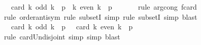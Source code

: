 \begin{isabellebody}
\ {\isachardoublequoteopen}{\isachardot}{\kern0pt}{\isachardot}{\kern0pt}{\isachardot}{\kern0pt}\ {\isacharequal}{\kern0pt}\ card\ {\isacharparenleft}{\kern0pt}{\isacharparenleft}{\kern0pt}{\isacharbraceleft}{\kern0pt}k{\isachardot}{\kern0pt}\ odd\ k{\isacharbraceright}{\kern0pt}\ {\isasyminter}\ {\isacharbraceleft}{\kern0pt}{}{\isachardot}{\kern0pt}{\isachardot}{\kern0pt}{\isacharless}{\kern0pt}p{\isacharbraceright}{\kern0pt}{\isacharparenright}{\kern0pt}\ {\isasymunion}\ {\isacharparenleft}{\kern0pt}{\isacharbraceleft}{\kern0pt}k{\isachardot}{\kern0pt}\ even\ k{\isacharbraceright}{\kern0pt}\ {\isasyminter}\ {\isacharbraceleft}{\kern0pt}{}{\isachardot}{\kern0pt}{\isachardot}{\kern0pt}{\isacharless}{\kern0pt}p{\isacharbraceright}{\kern0pt}{\isacharparenright}{\kern0pt}{\isacharparenright}{\kern0pt}{\isachardoublequoteclose}\ \isanewline
\ \ \ \ \isamarkupfalse%
\ {\isacharparenleft}{\kern0pt}rule\ arg{\isacharunderscore}{\kern0pt}cong{\isacharbrackleft}{\kern0pt}\ f{\isacharequal}{\kern0pt}{\isachardoublequoteopen}card{\isachardoublequoteclose}{\isacharbrackright}{\kern0pt}{\isacharparenright}{\kern0pt}\isanewline
\ \ \ \ \isamarkupfalse%
\ {\isacharparenleft}{\kern0pt}rule\ order{\isacharunderscore}{\kern0pt}antisym{\isacharcomma}{\kern0pt}\ rule\ subsetI{\isacharcomma}{\kern0pt}\ simp{\isacharcomma}{\kern0pt}\ rule\ subsetI{\isacharcomma}{\kern0pt}\ simp{\isacharcomma}{\kern0pt}\ blast{\isacharparenright}{\kern0pt}\isanewline
\ \ \isamarkupfalse%
\ \isamarkupfalse%
\ {\isachardoublequoteopen}{\isachardot}{\kern0pt}{\isachardot}{\kern0pt}{\isachardot}{\kern0pt}\ {\isacharequal}{\kern0pt}\ card\ {\isacharparenleft}{\kern0pt}{\isacharbraceleft}{\kern0pt}k{\isachardot}{\kern0pt}\ odd\ k{\isacharbraceright}{\kern0pt}\ {\isasyminter}\ {\isacharbraceleft}{\kern0pt}{}{\isachardot}{\kern0pt}{\isachardot}{\kern0pt}{\isacharless}{\kern0pt}p{\isacharbraceright}{\kern0pt}{\isacharparenright}{\kern0pt}\ {\isacharplus}{\kern0pt}\ \ card\ {\isacharparenleft}{\kern0pt}{\isacharbraceleft}{\kern0pt}k{\isachardot}{\kern0pt}\ even\ k{\isacharbraceright}{\kern0pt}\ {\isasyminter}\ {\isacharbraceleft}{\kern0pt}{}{\isachardot}{\kern0pt}{\isachardot}{\kern0pt}{\isacharless}{\kern0pt}p{\isacharbraceright}{\kern0pt}{\isacharparenright}{\kern0pt}{\isachardoublequoteclose}\isanewline
\ \ \ \ \isamarkupfalse%
\ {\isacharparenleft}{\kern0pt}rule\ card{\isacharunderscore}{\kern0pt}Un{\isacharunderscore}{\kern0pt}disjoint{\isacharcomma}{\kern0pt}\ simp{\isacharcomma}{\kern0pt}\ simp{\isacharcomma}{\kern0pt}\ blast{\isacharparenright}{\kern0pt}\isanewline

\end{isabellebody}
